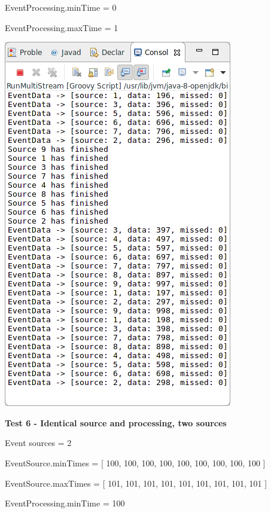 EventProcessing.minTime = 0

EventProcessing.maxTime = 1

\includegraphics[width=\textwidth/2]{img/screenshots/9-2-5.png}

\textbf{Test 6 - Identical source and processing, two sources}

Event sources = 2

EventSource.minTimes = [ 100, 100, 100, 100, 100, 100, 100, 100, 100 ]

EventSource.maxTimes = [ 101, 101, 101, 101, 101, 101, 101, 101, 101 ]

EventProcessing.minTime = 100

